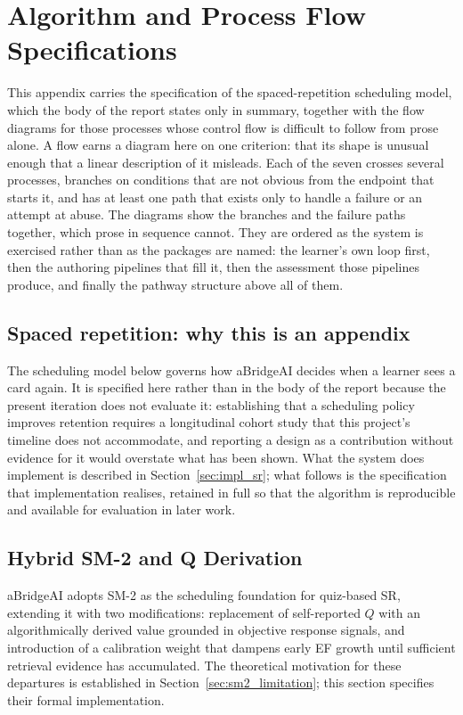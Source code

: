 \section{Algorithm and Process Flow Specifications}
\label{appendix:algorithm}
\label{sec:system_sm2}

This appendix carries the specification of the spaced-repetition scheduling
model, which the body of the report states only in summary, together with the
flow diagrams for those processes whose control flow is difficult to follow
from prose alone. A flow earns a diagram here on one criterion: that its shape
is unusual enough that a linear description of it misleads. Each of the seven
crosses several processes, branches on conditions that are not obvious from the
endpoint that starts it, and has at least one path that exists only to handle a
failure or an attempt at abuse. The diagrams show the branches and the failure
paths together, which prose in sequence cannot. They are ordered as the system
is exercised rather than as the packages are named: the learner's own loop
first, then the authoring pipelines that fill it, then the assessment those
pipelines produce, and finally the pathway structure above all of them.

\subsection*{Spaced repetition: why this is an appendix}

The scheduling model below governs how aBridgeAI decides when a learner sees a
card again. It is specified here rather than in the body of the report
because the present iteration does not evaluate it: establishing that a
scheduling policy improves retention requires a longitudinal cohort study that
this project's timeline does not accommodate, and reporting a design as a
contribution without evidence for it would overstate what has been shown. What
the system does implement is described in Section~\ref{sec:impl_sr}; what
follows is the specification that implementation realises, retained in full so
that the algorithm is reproducible and available for evaluation in later work.

\subsection{Hybrid SM-2 and Q Derivation}
\label{sec:q_derivation}
aBridgeAI adopts SM-2 as the scheduling foundation for quiz-based SR, extending it with two modifications: replacement of self-reported $Q$ with an algorithmically derived value grounded in objective response signals, and introduction of a calibration weight that dampens early EF growth until sufficient retrieval evidence has accumulated. The theoretical motivation for these departures is established in Section~\ref{sec:sm2_limitation}; this section specifies their formal implementation.

